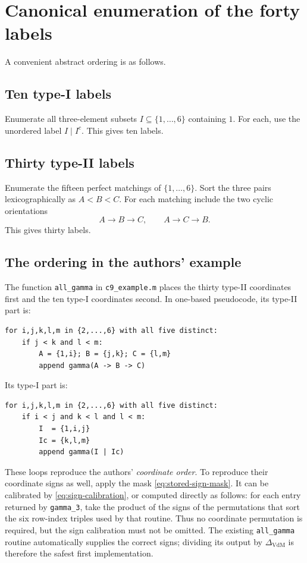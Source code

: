 \documentclass[11pt]{article}
\newcommand{\Deltav}{\Delta_{\mathrm{VdM}}}
\begin{document}
\section{Canonical enumeration of the forty labels}
\label{sec:ordering}

A convenient abstract ordering is as follows.

\subsection{Ten type-I labels}

Enumerate all three-element subsets $I\subseteq\{1,\ldots,6\}$ containing $1$.
For each, use the unordered label $I\mid I^c$.  This gives ten labels.

\subsection{Thirty type-II labels}

Enumerate the fifteen perfect matchings of $\{1,\ldots,6\}$.  Sort the three pairs
lexicographically as $A<B<C$.  For each matching include the two cyclic
orientations
\[
  A\to B\to C,
  \qquad
  A\to C\to B.
\]
This gives thirty labels.

\subsection{The ordering in the authors' example}

The function \texttt{all\_gamma} in \texttt{c9\_example.m} places the thirty
type-II coordinates first and the ten type-I coordinates second.  In one-based
pseudocode, its type-II part is:

\begin{lstlisting}
for i,j,k,l,m in {2,...,6} with all five distinct:
    if j < k and l < m:
        A = {1,i}; B = {j,k}; C = {l,m}
        append gamma(A -> B -> C)
\end{lstlisting}

Its type-I part is:

\begin{lstlisting}
for i,j,k,l,m in {2,...,6} with all five distinct:
    if i < j and k < l and l < m:
        I  = {1,i,j}
        Ic = {k,l,m}
        append gamma(I | Ic)
\end{lstlisting}

These loops reproduce the authors' \emph{coordinate order}.  To reproduce their
coordinate signs as well, apply the mask \eqref{eq:stored-sign-mask}.  It can be
calibrated by \eqref{eq:sign-calibration}, or computed directly as follows: for each
entry returned by \texttt{gamma\_3}, take the product of the signs of the
permutations that sort the six row-index triples used by that routine.  Thus no
coordinate permutation is required, but the sign calibration must not be omitted.
The existing \texttt{all\_gamma} routine automatically supplies the correct signs;
dividing its output by $\Deltav$ is therefore the safest first implementation.
\end{document}
